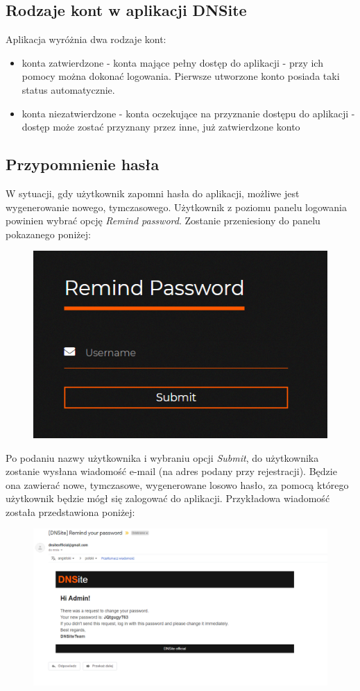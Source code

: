 \documentclass[12pt] {article}
\begin{document}
\subsection{Rodzaje kont w aplikacji DNSite}
Aplikacja wyróżnia dwa rodzaje kont:
\begin{itemize}
\item konta zatwierdzone - konta mające pełny dostęp do aplikacji - przy ich pomocy można dokonać logowania. Pierwsze utworzone konto posiada taki status automatycznie.
\item konta niezatwierdzone - konta oczekujące na przyznanie dostępu do aplikacji - dostęp może zostać przyznany przez inne, już zatwierdzone konto
\end{itemize}


\subsection{Przypomnienie hasła}
W sytuacji, gdy użytkownik zapomni hasła do aplikacji, możliwe jest wygenerowanie nowego, tymczasowego. Użytkownik z poziomu panelu logowania powinien wybrać opcję \emph{Remind password}. Zostanie przeniesiony do panelu pokazanego poniżej:
\begin{figure}[H]
\centering
\includegraphics[scale = 1]{res/4_nowe_haslo}
\end{figure}
Po podaniu nazwy użytkownika i wybraniu opcji \emph{Submit}, do użytkownika zostanie wysłana wiadomość e-mail (na adres podany przy rejestracji). Będzie ona zawierać nowe, tymczasowe, wygenerowane losowo hasło, za pomocą którego użytkownik będzie mógł się zalogować do aplikacji. Przykładowa wiadomość została przedstawiona poniżej:
\begin{figure}[H]
\centering
\includegraphics[width=\textwidth]{res/5_mail_haslo}
\end{figure}
\end{document}
